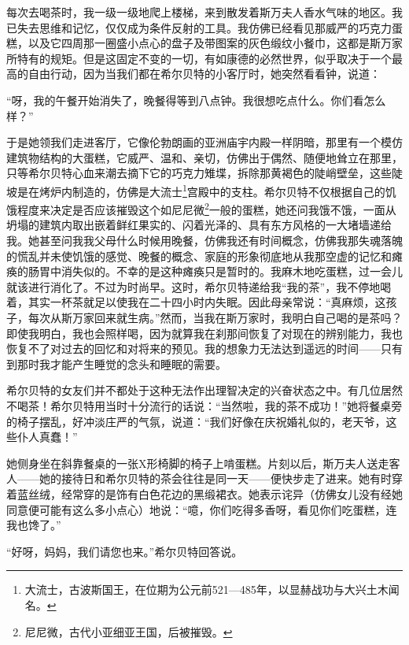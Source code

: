 \par 每次去喝茶时，我一级一级地爬上楼梯，来到散发着斯万夫人香水气味的地区。我已失去思维和记忆，仅仅成为条件反射的工具。我仿佛已经看见那威严的巧克力蛋糕，以及它四周那一圈盛小点心的盘子及带图案的灰色缎纹小餐巾，这都是斯万家所特有的规矩。但是这固定不变的一切，有如康德的必然世界，似乎取决于一个最高的自由行动，因为当我们都在希尔贝特的小客厅时，她突然看看钟，说道：
\par “呀，我的午餐开始消失了，晚餐得等到八点钟。我很想吃点什么。你们看怎么样？”
\par 于是她领我们走进客厅，它像伦勃朗画的亚洲庙宇内殿一样阴暗，那里有一个模仿建筑物结构的大蛋糕，它威严、温和、亲切，仿佛出于偶然、随便地耸立在那里，只等希尔贝特心血来潮去摘下它的巧克力雉堞，拆除那黄褐色的陡峭壁垒，这些陡坡是在烤炉内制造的，仿佛是大流士\footnote{大流士，古波斯国王，在位期为公元前521—485年，以显赫战功与大兴土木闻名。}宫殿中的支柱。希尔贝特不仅根据自己的饥饿程度来决定是否应该摧毁这个如尼尼微\footnote{尼尼微，古代小亚细亚王国，后被摧毁。}一般的蛋糕，她还问我饿不饿，一面从坍塌的建筑内取出嵌着鲜红果实的、闪着光泽的、具有东方风格的一大堵墙递给我。她甚至问我我父母什么时候用晚餐，仿佛我还有时间概念，仿佛我那失魂落魄的慌乱并未使饥饿的感觉、晚餐的概念、家庭的形象彻底地从我那空虚的记忆和瘫痪的肠胃中消失似的。不幸的是这种瘫痪只是暂时的。我麻木地吃蛋糕，过一会儿就该进行消化了。不过为时尚早。这时，希尔贝特递给我“我的茶”，我不停地喝着，其实一杯茶就足以使我在二十四小时内失眠。因此母亲常说：“真麻烦，这孩子，每次从斯万家回来就生病。”然而，当我在斯万家时，我明白自己喝的是茶吗？即使我明白，我也会照样喝，因为就算我在刹那间恢复了对现在的辨别能力，我也恢复不了对过去的回忆和对将来的预见。我的想象力无法达到遥远的时间——只有到那时我才能产生睡觉的念头和睡眠的需要。
\par 希尔贝特的女友们并不都处于这种无法作出理智决定的兴奋状态之中。有几位居然不喝茶！希尔贝特用当时十分流行的话说：“当然啦，我的茶不成功！”她将餐桌旁的椅子摆乱，好冲淡庄严的气氛，说道：“我们好像在庆祝婚礼似的，老天爷，这些仆人真蠢！”
\par 她侧身坐在斜靠餐桌的一张X形椅脚的椅子上啃蛋糕。片刻以后，斯万夫人送走客人——她的接待日和希尔贝特的茶会往往是同一天——便快步走了进来。她有时穿着蓝丝绒，经常穿的是饰有白色花边的黑缎裙衣。她表示诧异（仿佛女儿没有经她同意便可能有这么多小点心）地说：“噫，你们吃得多香呀，看见你们吃蛋糕，连我也馋了。”
\par “好呀，妈妈，我们请您也来。”希尔贝特回答说。
